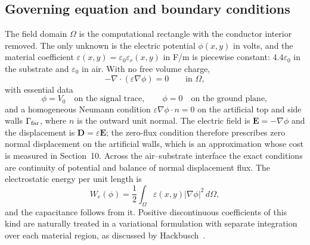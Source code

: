 \documentclass[11pt]{article}
\newcommand{\epsr}{\varepsilon_r}
\begin{document}
\subsection{Governing equation and boundary conditions}
The field domain $\Omega$ is the computational rectangle with the conductor interior
removed. The only unknown is the electric potential $\phi(x,y)$ in volts, and the material
coefficient $\varepsilon(x,y)=\varepsilon_0\epsr(x,y)$ in F/m is piecewise constant:
$4.4\varepsilon_0$ in the substrate and $\varepsilon_0$ in air. With no free volume charge,
\begin{equation}
 -\nabla\cdot(\varepsilon \nabla \phi)=0 \qquad \text{in }\Omega ,
 \label{eq:pde}
\end{equation}
with essential data
\[
\phi=V_0 \quad \text{on the signal trace},\qquad
\phi=0 \quad \text{on the ground plane},
\]
and a homogeneous Neumann condition $\varepsilon\nabla\phi\cdot n=0$ on the artificial top
and side walls $\Gamma_{\rm far}$, where $n$ is the outward unit normal. The electric
field is $\mathbf E=-\nabla\phi$ and the displacement is $\mathbf D=\varepsilon\mathbf E$;
the zero-flux condition therefore prescribes zero normal displacement on the artificial
walls, which is an approximation whose cost is measured in Section~10. Across the
air--substrate interface the exact conditions are continuity of potential and balance of
normal displacement flux. The electrostatic energy per unit length is
\begin{equation}
W_e(\phi)=\frac12\int_\Omega\varepsilon(x,y)|\nabla\phi|^2\,d\Omega ,
\label{eq:energy}
\end{equation}
and the capacitance follows from it. Positive discontinuous coefficients of this kind are
naturally treated in a variational formulation with separate integration over each
material region, as discussed by Hackbusch~\cite[Sec.~10.1]{hackbusch2017}.
\end{document}
